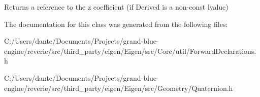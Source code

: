 \begin{DoxyReturn}{Returns}
a reference to the {\ttfamily z} coefficient (if Derived is a non-\/const lvalue) 
\end{DoxyReturn}


The documentation for this class was generated from the following files\+:\begin{DoxyCompactItemize}
\item 
C\+:/\+Users/dante/\+Documents/\+Projects/grand-\/blue-\/engine/reverie/src/third\+\_\+party/eigen/\+Eigen/src/\+Core/util/Forward\+Declarations.\+h\item 
C\+:/\+Users/dante/\+Documents/\+Projects/grand-\/blue-\/engine/reverie/src/third\+\_\+party/eigen/\+Eigen/src/\+Geometry/Quaternion.\+h\end{DoxyCompactItemize}
